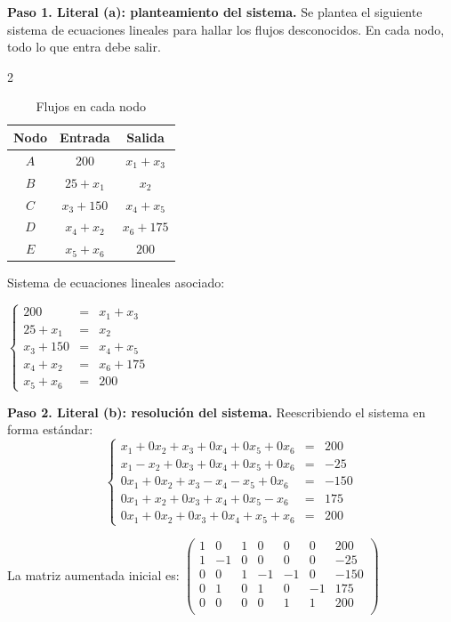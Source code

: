 \begin{prob}
\begin{myproof}
\textbf{Paso 1. Literal (a): planteamiento del sistema.} Se plantea el siguiente sistema de ecuaciones lineales para hallar los flujos desconocidos. En cada nodo, todo lo que entra debe salir.

\begin{multicols}{2}
\begin{table}[H]
\centering
\begin{tabular}{|c|c|c|}\hline
Nodo & Entrada & Salida\\\hline
$A$&200&$x_1+x_3$\\\hline
$B$&$25+x_1$&$x_2$\\\hline
$C$&$x_3+150$&$x_4+x_5$\\\hline
$D$&$x_4+x_2$&$x_6+175$\\\hline
$E$&$x_5+x_6$&$200$\\\hline
\end{tabular}
\caption{Flujos en cada nodo}
\end{table}
\columnbreak

Sistema de ecuaciones lineales asociado:

$\left\lbrace\begin{matrix}
200&=&x_1+x_3\\
25+x_1&=&x_2\\
x_3+150&=&x_4+x_5\\
x_4+x_2&=&x_6+175\\
x_5+x_6&=&200
\end{matrix}\right.$
\end{multicols}

\textbf{Paso 2. Literal (b): resolución del sistema.} Reescribiendo el sistema en forma estándar:
$$\left\lbrace\begin{matrix}
x_1 + 0x_2 + x_3 + 0x_4 + 0x_5 + 0x_6 &=& 200\\
x_1 - x_2 + 0x_3 + 0x_4 + 0x_5 + 0x_6 &=& -25\\
0x_1 + 0x_2 + x_3 - x_4 - x_5 + 0x_6 &=& -150\\
0x_1 + x_2 + 0x_3 + x_4 + 0x_5 - x_6 &=& 175\\
0x_1 + 0x_2 + 0x_3 + 0x_4 + x_5 + x_6 &=& 200
\end{matrix}\right.$$

La matriz aumentada inicial es: $\left( \begin{array}{cccccc|c}
1&0&1&0&0&0&200\\
1&-1&0&0&0&0&-25\\
0&0&1&-1&-1&0&-150\\
0&1&0&1&0&-1&175\\
0&0&0&0&1&1&200\\
\end{array}\right)$


\end{myproof}
\end{prob}
